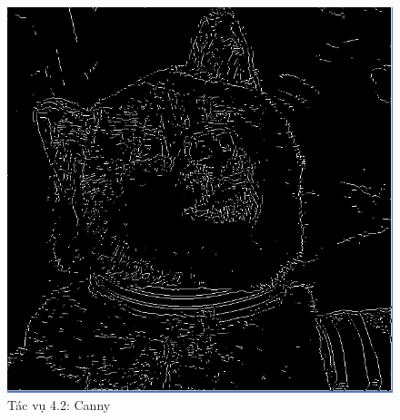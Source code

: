 \documentclass{article}
\begin{document}
	\begin{figure}[H]
		\centering
		\includegraphics[scale = 0.4]{42canny}
		\caption{Tác vụ 4.2: Canny}
	\end{figure}
\end{document}
